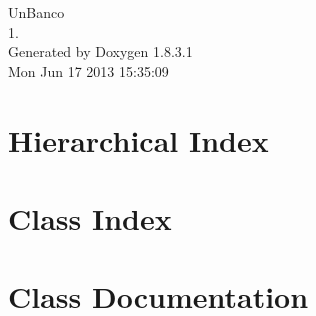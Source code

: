 \documentclass{book}
\begin{document}
\hypersetup{pageanchor=false,citecolor=blue}
\begin{titlepage}
\vspace*{7cm}
\begin{center}
{\Large Un\-Banco \\[1ex]\large 1. }\\
\vspace*{1cm}
{\large Generated by Doxygen 1.8.3.1}\\
\vspace*{0.5cm}
{\small Mon Jun 17 2013 15:35:09}\\
\end{center}
\end{titlepage}
\clearemptydoublepage
{}
\tableofcontents
\clearemptydoublepage
{}
\hypersetup{pageanchor=true,citecolor=blue}
\chapter{Hierarchical Index}

\chapter{Class Index}

\chapter{Class Documentation}




























\printindex
\end{document}
